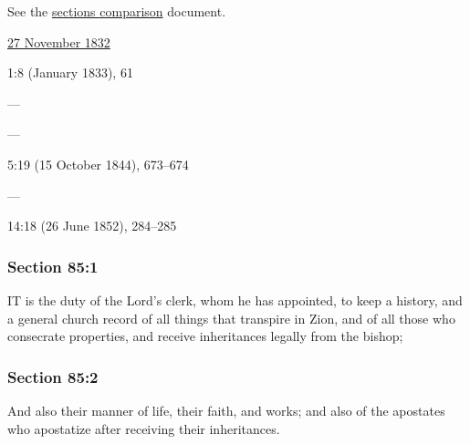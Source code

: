 		See the \href{https://drive.google.com/file/d/1goAvNz8jS4R8slYfMG_db55Ty2z_vmgK/view?usp=sharing}{sections comparison} document.
	
		\begin{compactdesc}
			\item[JSP] \hyperref[EMS-1832-JS-27-NOV-1832]{27 November 1832}
			\item[EMS] 1:8 (January 1833), 61
			\item[BC] ---
			\item[DC 1835] ---
			\item[TS] 5:19 (15 October 1844), 673--674
			\item[DC 1844] ---
			\item[MS] 14:18 (26 June 1852), 284--285
		\end{compactdesc}

	\subsubsection{Section 85:1} %
		\label{DC85-1}

		IT is the duty of the Lord's clerk, whom he has appointed, to keep a history, and a general church record of all things that transpire in Zion, and of all those who consecrate properties, and receive inheritances legally from the bishop;


	\subsubsection{Section 85:2} %
		\label{DC85-2}

		And also their manner of life, their faith, and works; and also of the apostates who apostatize after receiving their inheritances.


